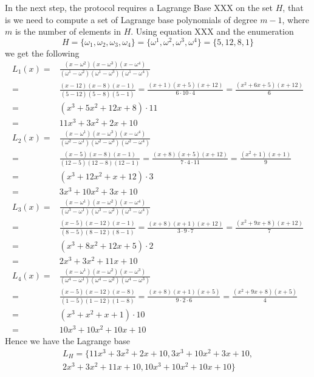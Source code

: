 \begin{example}
In the next step, the protocol requires a Lagrange Base XXX on the set $H$, that is we need to compute a set of Lagrange base polynomials of degree $m-1$, where $m$ is the number of elements in $H$. Using equation XXX and the enumeration 
$$
H= \{\omega_1, \omega_2, \omega_3, \omega_4\} = \{\omega^1,\omega^2,\omega^3, \omega^4\} =  \{5,12,8,1\}
$$
 we get the following
\begin{equation}
\begin{array}{rl}
L_1(x) = &  \frac{(x-\omega^2)(x-\omega^3)(x-\omega^4)}{(\omega^1-\omega^2)(\omega^1-\omega^3)(\omega^1-\omega^4)}\\
       = &  \frac{(x-12)(x-8)(x-1)}{(5-12)(5-8)(5-1)}
       = \frac{(x+1)(x+5)(x+12)}{6\cdot 10\cdot 4}
       = \frac{(x^2+6x+5)(x+12)}{6} \\
       = & (x^3 +5x^2 +12x + 8)\cdot 11 \\
       = & 11x^3 +3x^2 +2x + 10\\
L_2(x) = &  \frac{(x-\omega^1)(x-\omega^3)(x-\omega^4)}{(\omega^2-\omega^1)(\omega^2-\omega^3)(\omega^2-\omega^4)}\\
       = &  \frac{(x-5)(x-8)(x-1)}{(12-5)(12-8)(12-1)}
       =    \frac{(x+8)(x+5)(x+12)}{7\cdot 4\cdot 11}
       =    \frac{(x^2+1)(x+1)}{9} \\
       = &   (x^3 +12x^2+x + 12)\cdot 3 \\
       = &  3x^3 +10x^2+ 3x + 10\\
L_3(x) = &  \frac{(x-\omega^1)(x-\omega^2)(x-\omega^4)}{(\omega^3-\omega^1)(\omega^3-\omega^2)(\omega^3-\omega^4)}\\
       = &  \frac{(x-5)(x-12)(x-1)}{(8-5)(8-12)(8-1)}
       =   \frac{(x+8)(x+1)(x+12)}{3\cdot 9\cdot 7}
       =   \frac{(x^2+9x+8)(x+12)}{7} \\
       = &   (x^3 + 8x^2 +12x +5) \cdot 2\\
       = &  2x^3 + 3x^2 +11x +10 \\
L_4(x) = &  \frac{(x-\omega^1)(x-\omega^2)(x-\omega^3)}{(\omega^4-\omega^1)(\omega^4-\omega^2)(\omega^4-\omega^3)}\\
       = &  \frac{(x-5)(x-12)(x-8)}{(1-5)(1-12)(1-8)}
       = \frac{(x+8)(x+1)(x+5)}{9\cdot 2\cdot 6}
       = \frac{(x^2 +9x + 8)(x+5)}{4} \\
       = & (x^3 + x^2 +x + 1)\cdot 10 \\
       = & 10x^3 + 10 x^2 +10x + 10
\end{array}
\end{equation}
Hence we have the Lagrange base
\begin{multline}
L_H = \{ 11x^3 +3x^2 +2x + 10, 3x^3 +10x^2+ 3x + 10, \\ 2x^3 + 3x^2 +11x +10, 10x^3 + 10 x^2 +10x + 10\}
\end{multline}


\end{example}
